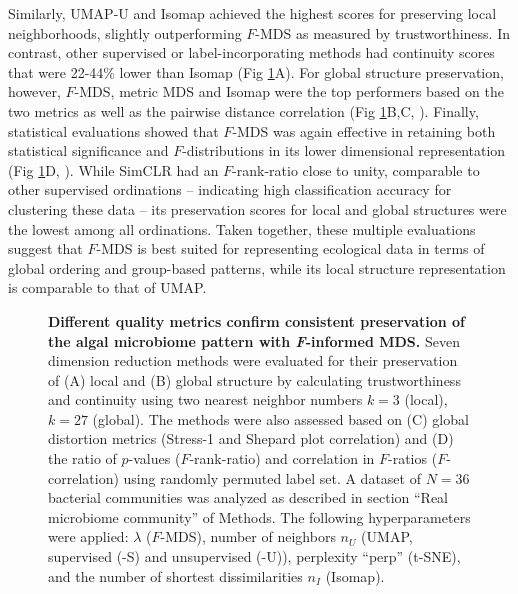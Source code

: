 \documentclass[10pt,letterpaper]{article}
\newcommand{\1}{{\rm 1}\kern-0.24em{\rm I}}
\begin{document}
Similarly, UMAP-U and Isomap achieved the highest scores for preserving local neighborhoods, slightly outperforming $F$-MDS as measured by trustworthiness. In contrast, other supervised or label-incorporating methods had continuity scores that were 22-44\% lower than Isomap (Fig \ref{fig:eval_real}A). For global structure preservation, however, $F$-MDS, metric MDS and Isomap were the top performers based on the two metrics as well as the pairwise distance correlation (Fig \ref{fig:eval_real}B,C, ). Finally, statistical evaluations showed that $F$-MDS was again effective in retaining both statistical significance and $F$-distributions in its lower dimensional representation (Fig \ref{fig:eval_real}D, ). While SimCLR had an $F$-rank-ratio close to unity, comparable to other supervised ordinations – indicating high classification accuracy for clustering these data – its preservation scores for local and global structures were the lowest among all ordinations. Taken together, these multiple evaluations suggest that $F$-MDS is best suited for representing ecological data in terms of global ordering and group-based patterns, while its local structure representation is comparable to that of UMAP.


\begin{figure}[h!]
    \centering
    \caption{\textbf{Different quality metrics confirm consistent preservation of the algal microbiome pattern with \textit{F}-informed MDS.} Seven dimension reduction methods were evaluated for their preservation of (A) local and (B) global structure by calculating trustworthiness and continuity using two nearest neighbor numbers $k=3$ (local), $k=27$ (global). The methods were also assessed based on (C) global distortion metrics (Stress-1 and Shepard plot correlation) and (D) the ratio of $p$-values ($F$-rank-ratio) and correlation in $F$-ratios ($F$-correlation) using randomly permuted label set. A dataset of $N=36$ bacterial communities was analyzed as described in section ``Real microbiome community'' of Methods. The following hyperparameters were applied: $\lambda$ ($F$-MDS), number of neighbors $n_U$ (UMAP, supervised (-S) and unsupervised (-U)), perplexity ``perp'' (t-SNE), and the number of shortest dissimilarities $n_I$ (Isomap).}
    \label{fig:eval_real}
\end{figure}
\end{document}
